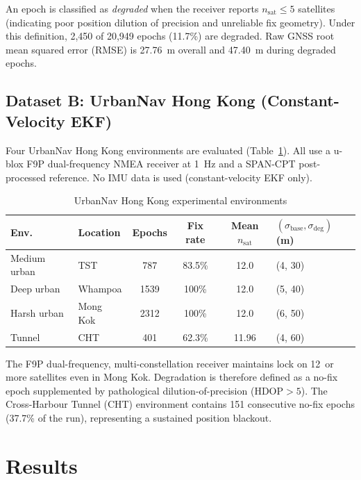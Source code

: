 \documentclass[journal]{IEEEtran}
\newcommand{\sigbase}{\sigma_{\mathrm{base}}}
\newcommand{\sigdeg}{\sigma_{\mathrm{deg}}}
\begin{document}
An epoch is classified as \textit{degraded} when the receiver reports
$n_\text{sat} \leq 5$ satellites (indicating poor position dilution of
precision and unreliable fix geometry).  Under this definition, 2,450 of
20,949 epochs (11.7\%) are degraded.  Raw GNSS root mean squared error
(RMSE) is 27.76~m overall and 47.40~m during degraded epochs.

\subsection{Dataset B: UrbanNav Hong Kong (Constant-Velocity EKF)}
\label{subsec:hk_setup}

Four UrbanNav Hong Kong environments are evaluated (Table~\ref{tab:hk_envs}).
All use a u-blox F9P dual-frequency NMEA receiver at 1~Hz and a SPAN-CPT
post-processed reference.  No IMU data is used (constant-velocity EKF only).

\begin{table}[h]
\caption{UrbanNav Hong Kong experimental environments}
\label{tab:hk_envs}
\begin{tabular}{@{}llcccl@{}}
\toprule
Env. & Location & Epochs & Fix rate & Mean $n_\text{sat}$ &
  $(\sigbase,\sigdeg)$ (m) \\
\midrule
Medium urban  & TST      & 787  & 83.5\% & 12.0 & (4, 30) \\
Deep urban    & Whampoa  & 1539 & 100\%  & 12.0 & (5, 40) \\
Harsh urban   & Mong Kok & 2312 & 100\%  & 12.0 & (6, 50) \\
Tunnel        & CHT      & 401  & 62.3\% & 11.96& (4, 60) \\
\bottomrule
\end{tabular}
\end{table}

The F9P dual-frequency, multi-constellation receiver maintains lock on
12~or more satellites even in Mong Kok.  Degradation is therefore defined
as a no-fix epoch supplemented by pathological dilution-of-precision
($\text{HDOP} > 5$).  The Cross-Harbour Tunnel (CHT) environment contains
151 consecutive no-fix epochs (37.7\% of the run), representing a
sustained position blackout.

\section{Results}
\label{sec:results}
\end{document}
